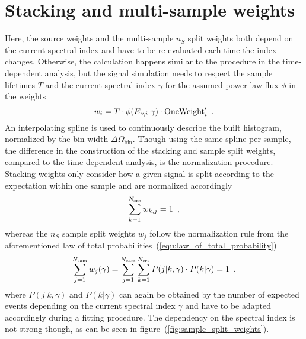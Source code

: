 \section{Stacking and multi-sample weights}
Here, the source weights and the multi-sample $n_S$ split weights both depend on the current spectral index and have to be re-evaluated each time the index changes.
Otherwise, the calculation happens similar to the procedure in the time-dependent analysis, but the signal simulation needs to respect the sample lifetimes $T$ and the current spectral index $\gamma$ for the assumed power-law flux $\phi$ in the weights
\begin{equation}
  w_i = T\cdot \phi(E_{\nu,i}|\gamma)\cdot\text{OneWeight}'_i
  \enspace\text{.}
\end{equation}
An interpolating spline is used to continuously describe the built histogram, normalized by the bin width $\Delta\Omega_\text{bin}$.
Though using the same spline per sample, the difference in the construction of the stacking and sample split weights, compared to the time-dependent analysis, is the normalization procedure.
Stacking weights only consider how a given signal is split according to the expectation within one sample and are normalized accordingly
\begin{equation}
  \sum_{k=1}^{N_\text{src}} w_{k,j} = 1
  \enspace\text{,}
\end{equation}
whereas the $n_S$ sample split weights $w_j$ follow the normalization rule from the aforementioned law of total probabilities~(\ref{equ:law_of_total_probability})
\begin{equation}
  \sum_{j=1}^{N_\text{sam}} w_j(\gamma)
  = \sum_{j=1}^{N_\text{sam}} \sum_{k=1}^{N_\text{src}}
      P(j|k,\gamma)\cdot P(k|\gamma) = 1
  \enspace\text{,}
\end{equation}
where $P(j|k,\gamma)$ and $P(k|\gamma)$ can again be obtained by the number of expected events depending on the current spectral index $\gamma$ and have to be adapted accordingly during a fitting procedure.
The dependency on the spectral index is not strong though, as can be seen in figure~(\ref{fig:sample_split_weights}).


